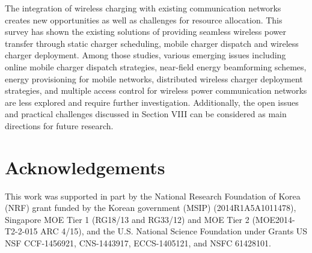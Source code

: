 \documentclass[twocolumn,10pt]{IEEEtran}
\begin{document}
The integration of wireless charging with existing communication networks creates new opportunities as well as challenges for resource allocation. This survey has shown the existing solutions of providing seamless wireless power transfer through static charger scheduling, mobile charger dispatch and wireless charger deployment. Among those studies, various emerging issues including online mobile charger dispatch strategies, near-field energy beamforming schemes, energy provisioning for mobile networks, distributed wireless charger deployment strategies, and multiple access control for wireless power communication networks are less explored and require further investigation. Additionally, the open issues and practical challenges discussed in Section VIII can be considered as main directions for future research.

\section*{Acknowledgements}

This work was supported in part by the National Research Foundation of Korea (NRF) grant funded by the Korean government (MSIP) (2014R1A5A1011478), Singapore MOE Tier 1 (RG18/13 and RG33/12) and MOE Tier 2 (MOE2014-T2-2-015 ARC 4/15), and the U.S. National Science Foundation under Grants US NSF CCF-1456921, CNS-1443917, ECCS-1405121, and NSFC 61428101. 
 
\end{document}
